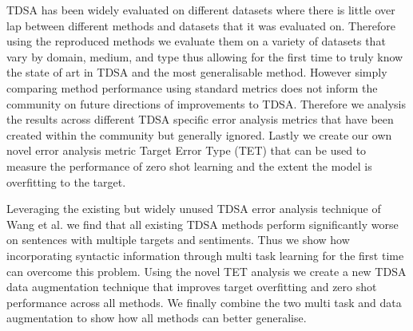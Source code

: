 TDSA has been widely evaluated on different datasets where there is little over lap between different methods and datasets that it was evaluated on. Therefore using the reproduced methods we evaluate them on a variety of datasets that vary by domain, medium, and type thus allowing for the first time to truly know the state of art in TDSA and the most generalisable method. However simply comparing method performance using standard metrics does not inform the community on future directions of improvements to TDSA. Therefore we analysis the results across different TDSA specific error analysis metrics that have been created within the community but generally ignored. Lastly we create our own novel error analysis metric Target Error Type (TET) that can be used to measure the performance of zero shot learning and the extent the model is overfitting to the target.

Leveraging the existing but widely unused TDSA error analysis technique of Wang et al. \cite{repro_wang_2017} we find that all existing TDSA methods perform significantly worse on sentences with multiple targets and sentiments. Thus we show how incorporating syntactic information through multi task learning for the first time can overcome this problem. Using the novel TET analysis we create a new TDSA data augmentation technique that improves target overfitting and zero shot performance across all methods. We finally combine the two multi task and data augmentation to show how all methods can better generalise.










